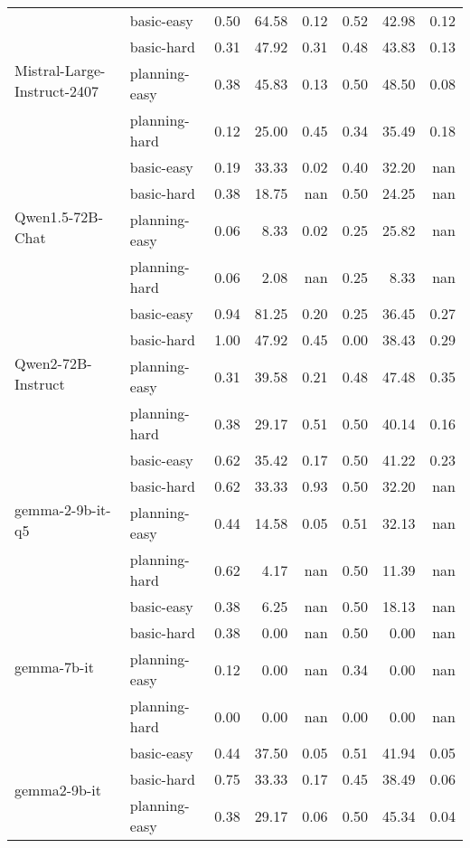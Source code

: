 \begin{tabular}{llrrrrrr}
\cline{1-8}
\multirow[c]{4}{*}{Mistral-Large-Instruct-2407} & basic-easy & 0.50 & 64.58 & 0.12 & 0.52 & 42.98 & 0.12 \\
 & basic-hard & 0.31 & 47.92 & 0.31 & 0.48 & 43.83 & 0.13 \\
 & planning-easy & 0.38 & 45.83 & 0.13 & 0.50 & 48.50 & 0.08 \\
 & planning-hard & 0.12 & 25.00 & 0.45 & 0.34 & 35.49 & 0.18 \\
\cline{1-8}
\multirow[c]{4}{*}{Qwen1.5-72B-Chat} & basic-easy & 0.19 & 33.33 & 0.02 & 0.40 & 32.20 & nan \\
 & basic-hard & 0.38 & 18.75 & nan & 0.50 & 24.25 & nan \\
 & planning-easy & 0.06 & 8.33 & 0.02 & 0.25 & 25.82 & nan \\
 & planning-hard & 0.06 & 2.08 & nan & 0.25 & 8.33 & nan \\
\cline{1-8}
\multirow[c]{4}{*}{Qwen2-72B-Instruct} & basic-easy & 0.94 & 81.25 & 0.20 & 0.25 & 36.45 & 0.27 \\
 & basic-hard & 1.00 & 47.92 & 0.45 & 0.00 & 38.43 & 0.29 \\
 & planning-easy & 0.31 & 39.58 & 0.21 & 0.48 & 47.48 & 0.35 \\
 & planning-hard & 0.38 & 29.17 & 0.51 & 0.50 & 40.14 & 0.16 \\
\cline{1-8}
\multirow[c]{4}{*}{gemma-2-9b-it-q5} & basic-easy & 0.62 & 35.42 & 0.17 & 0.50 & 41.22 & 0.23 \\
 & basic-hard & 0.62 & 33.33 & 0.93 & 0.50 & 32.20 & nan \\
 & planning-easy & 0.44 & 14.58 & 0.05 & 0.51 & 32.13 & nan \\
 & planning-hard & 0.62 & 4.17 & nan & 0.50 & 11.39 & nan \\
\cline{1-8}
\multirow[c]{4}{*}{gemma-7b-it} & basic-easy & 0.38 & 6.25 & nan & 0.50 & 18.13 & nan \\
 & basic-hard & 0.38 & 0.00 & nan & 0.50 & 0.00 & nan \\
 & planning-easy & 0.12 & 0.00 & nan & 0.34 & 0.00 & nan \\
 & planning-hard & 0.00 & 0.00 & nan & 0.00 & 0.00 & nan \\
\cline{1-8}
\multirow[c]{4}{*}{gemma2-9b-it} & basic-easy & 0.44 & 37.50 & 0.05 & 0.51 & 41.94 & 0.05 \\
 & basic-hard & 0.75 & 33.33 & 0.17 & 0.45 & 38.49 & 0.06 \\
 & planning-easy & 0.38 & 29.17 & 0.06 & 0.50 & 45.34 & 0.04 \\

\end{tabular}
